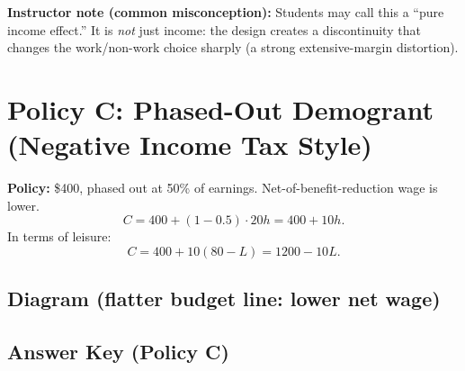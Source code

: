 \documentclass[12pt]{article}
\begin{document}
\textbf{Instructor note (common misconception):} Students may call this a ``pure income effect.'' It is \emph{not} just income: the design creates a discontinuity that changes the work/non-work choice sharply (a strong extensive-margin distortion).

\newpage

\section*{Policy C: Phased-Out Demogrant (Negative Income Tax Style)}

\textbf{Policy:} \$400, phased out at 50\% of earnings. Net-of-benefit-reduction wage is lower.
\[
C = 400 + (1-0.5)\cdot 20h = 400 + 10h.
\]
In terms of leisure:
\[
C = 400 + 10(80-L) = 1200 - 10L.
\]

\subsection*{Diagram (flatter budget line: lower net wage)}

\begin{center}
\end{center}

\subsection*{Answer Key (Policy C)}
\end{document}
